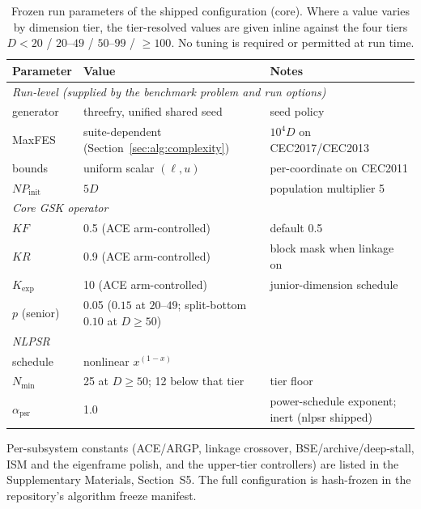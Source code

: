 \begin{table}[t]
\caption{Frozen run parameters of the shipped configuration (core).
Where a value varies by dimension tier, the tier-resolved values are given
inline against the four tiers $D{<}20$ / $20$--$49$ / $50$--$99$ / ${\ge}100$.
No tuning is required or permitted at run time.}
\label{tab:parameters}
\centering
\small
\begin{tabular}{lll}
\toprule
\textbf{Parameter} & \textbf{Value} & \textbf{Notes}\\
\midrule
\multicolumn{3}{l}{\emph{Run-level (supplied by the benchmark problem and run options)}}\\
\midrule
generator & threefry, unified shared seed & seed policy\\
MaxFES & suite-dependent (Section~\ref{sec:alg:complexity}) & $10^4 D$ on CEC2017/CEC2013\\
bounds & uniform scalar $(\ell,u)$ & per-coordinate on CEC2011\\
$NP_{\text{init}}$ & $5D$ & population multiplier 5\\
\midrule
\multicolumn{3}{l}{\emph{Core GSK operator}}\\
\midrule
$KF$ & 0.5 (ACE arm-controlled) & default 0.5\\
$KR$ & 0.9 (ACE arm-controlled) & block mask when linkage on\\
$K_{\exp}$ & 10 (ACE arm-controlled) & junior-dimension schedule\\
$p$ (senior) & 0.05 ($0.15$ at $20$--$49$; split-bottom $0.10$ at $D\ge50$) & \\
\midrule
\multicolumn{3}{l}{\emph{NLPSR}}\\
\midrule
schedule & nonlinear $x^{(1-x)}$ & \\
$N_{\min}$ & 25 at $D\ge50$; 12 below that tier & tier floor\\
$\alpha_{\text{psr}}$ & 1.0 & power-schedule exponent; inert (nlpsr shipped)\\
\bottomrule
\end{tabular}

\vspace{2pt}
{\footnotesize Per-subsystem constants (ACE/ARGP, linkage crossover,
BSE/archive/deep-stall, ISM and the eigenframe polish, and the upper-tier
controllers) are listed in the Supplementary Materials, Section~S5. The
full configuration is hash-frozen in the repository's algorithm freeze
manifest.}
\end{table}
